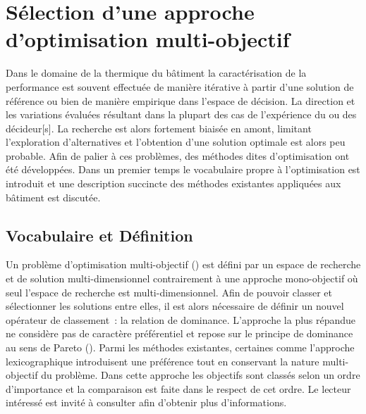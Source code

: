 \section{Sélection d’une approche d’optimisation multi-objectif} %
\label{sec:selection_d_une_approche_d_optimisation_multi_objectif}
Dans le domaine de la thermique du bâtiment la caractérisation de la performance est
souvent effectuée de manière itérative à partir d’une solution de référence ou bien de
manière empirique dans l’espace de décision. La direction et les variations évaluées
résultant dans la plupart des cas de l’expérience du ou des décideur[s]. La recherche est
alors fortement biaisée en amont, limitant l’exploration d’alternatives et l’obtention
d’une solution optimale est alors peu probable. Afin de palier à ces problèmes, des
méthodes dites d’optimisation ont été développées. Dans un premier temps le vocabulaire
propre à l’optimisation est introduit et une description succincte des méthodes existantes
appliquées aux bâtiment est discutée.



\subsection{Vocabulaire et Définition} %
\label{sub:vocabulaire_et_definition}
Un problème d’optimisation multi-objectif ()
est défini par un espace de recherche et de solution multi-dimensionnel contrairement à
une approche mono-objectif où seul l’espace de recherche est multi-dimensionnel. Afin de
pouvoir classer et sélectionner les solutions entre elles, il est alors nécessaire de
définir un nouvel opérateur de classement~: la relation de dominance. L’approche la plus
répandue ne considère pas de caractère préférentiel et repose sur le principe de dominance
au sens de Pareto (). Parmi les méthodes
existantes, certaines comme l’approche lexicographique introduisent une préférence tout en
conservant la nature multi- objectif du problème. Dans cette
approche les objectifs sont classés selon un ordre d’importance et la comparaison est
faite dans le respect de cet ordre. Le lecteur intéressé est invité à consulter
\textcite{Collette2002} afin d’obtenir plus d’informations.

